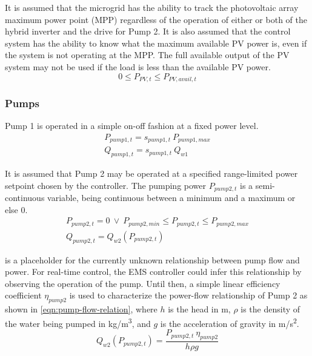 It is assumed that the microgrid has the ability to track the photovoltaic array maximum power point (MPP) regardless of the operation of either or both of the hybrid inverter and the drive for Pump 2. It is also assumed that the control system has the ability to know what the maximum available PV power is, even if the system is not operating at the MPP. The full available output of the PV system may not be used if the load is less than the available PV power.
%
\begin{equation}
\label{eqn:pv-limit}
0 \le P_{PV,t} \le P_{PV,avail,t}
\end{equation}

\subsubsection{Pumps}

Pump 1 is operated in a simple on-off fashion at a fixed power level.
%
\begin{gather}
\label{eqn:pump1-power}
P_{pump1,t} = s_{pump1,t} \ P_{pump1,max} \\
\label{eqn:pump1-flow}
Q_{pump1,t} = s_{pump1,t} \ Q_{w1}
\end{gather}

It is assumed that Pump 2 may be operated at a specified range-limited power setpoint chosen by the controller. The pumping power $P_{pump2,t}$ is a semi-continuous variable, being continuous between a minimum and a maximum or else 0.
%
\begin{gather}
\label{eqn:pump2-power}
P_{pump2,t} = 0 \ \lor \ P_{pump2,min} \le P_{pump2,t} \le P_{pump2,max} \\
\label{eqn:pump2-flow}
Q_{pump2,t} = Q_{w2}\left( P_{pump2,t} \right)
\end{gather}

 is a placeholder for the currently unknown relationship between pump flow and power. For real-time control, the EMS controller could infer this relationship by observing the operation of the pump. Until then, a simple linear efficiency coefficient $\eta_{pump2}$ is used to characterize the power-flow relationship of Pump 2 as shown in \cref{eqn:pump-flow-relation}, where $h$ is the head in \si{m}, $\rho$ is the density of the water being pumped in \si{kg/m^3}, and $g$ is the acceleration of gravity in \si{m/s^2}.
%
\begin{equation}
\label{eqn:pump-flow-relation}
 Q_{w2}\left( P_{pump2,t} \right) = \frac{P_{pump2,t} \ \eta_{pump2}}{h \rho g}
\end{equation}

